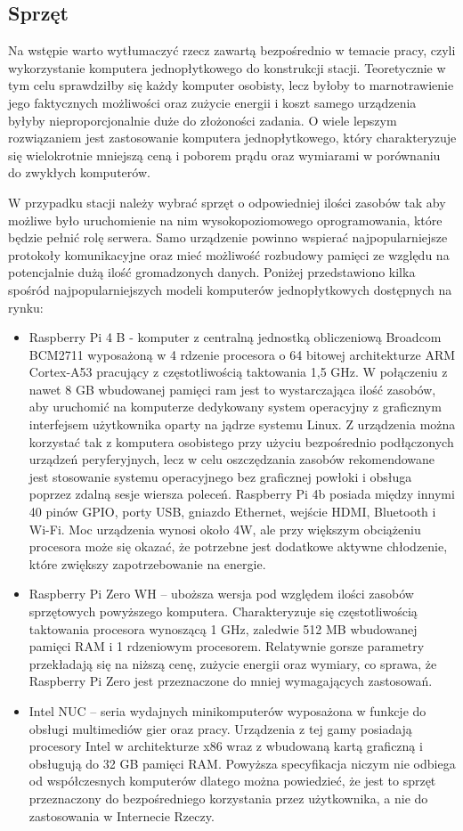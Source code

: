 \documentclass[12pt, twoside, openany]{mwrep}
\begin{document}
\subsection{Sprzęt}
Na wstępie warto wytłumaczyć rzecz zawartą bezpośrednio w temacie pracy, czyli wykorzystanie komputera jednopłytkowego do konstrukcji stacji. Teoretycznie w tym celu sprawdziłby się każdy komputer osobisty, lecz byłoby to marnotrawienie jego faktycznych możliwości oraz zużycie energii i koszt samego urządzenia byłyby nieproporcjonalnie duże do złożoności zadania. O wiele lepszym rozwiązaniem jest zastosowanie komputera jednopłytkowego, który charakteryzuje się wielokrotnie mniejszą ceną i poborem prądu oraz wymiarami w porównaniu do zwykłych komputerów.
\par
W przypadku stacji należy wybrać sprzęt o odpowiedniej ilości zasobów tak aby możliwe było uruchomienie na nim wysokopoziomowego oprogramowania, które będzie pełnić rolę serwera. Samo urządzenie powinno wspierać najpopularniejsze protokoły komunikacyjne oraz mieć możliwość rozbudowy pamięci ze względu na potencjalnie dużą ilość gromadzonych danych. Poniżej przedstawiono kilka spośród najpopularniejszych modeli komputerów jednopłytkowych dostępnych na rynku:
\begin{itemize}
\item	Raspberry Pi 4 B - komputer z centralną jednostką obliczeniową Broadcom BCM2711 wyposażoną w 4 rdzenie procesora o 64 bitowej architekturze ARM Cortex-A53 pracujący z częstotliwością taktowania 1,5 GHz. W połączeniu z nawet 8 GB wbudowanej pamięci ram jest to wystarczająca ilość zasobów, aby uruchomić na komputerze dedykowany system operacyjny z graficznym interfejsem użytkownika oparty na jądrze systemu Linux. Z urządzenia można korzystać tak z komputera osobistego przy użyciu bezpośrednio podłączonych urządzeń peryferyjnych, lecz w celu oszczędzania zasobów rekomendowane jest stosowanie systemu operacyjnego bez graficznej powłoki i obsługa poprzez zdalną sesje wiersza poleceń. Raspberry Pi 4b posiada między innymi 40 pinów GPIO, porty USB, gniazdo Ethernet, wejście HDMI, Bluetooth i Wi-Fi. Moc urządzenia wynosi około 4W, ale przy większym obciążeniu procesora może się okazać, że potrzebne jest dodatkowe aktywne chłodzenie, które zwiększy zapotrzebowanie na energie.  
\item	Raspberry Pi Zero WH – uboższa wersja pod względem ilości zasobów sprzętowych powyższego komputera. Charakteryzuje się częstotliwością taktowania procesora wynoszącą 1 GHz, zaledwie 512 MB wbudowanej pamięci RAM i 1 rdzeniowym procesorem. Relatywnie gorsze parametry przekładają się na niższą cenę, zużycie energii oraz wymiary, co sprawa, że Raspberry Pi Zero jest przeznaczone do mniej wymagających zastosowań.
\item	Intel NUC – seria wydajnych minikomputerów wyposażona w funkcje do obsługi multimediów gier oraz pracy. Urządzenia z tej gamy posiadają procesory Intel w architekturze x86 wraz z wbudowaną kartą graficzną i obsługują do 32 GB pamięci RAM. Powyższa specyfikacja niczym nie odbiega od współczesnych komputerów dlatego można powiedzieć, że jest to sprzęt przeznaczony do bezpośredniego korzystania przez użytkownika, a nie do zastosowania w Internecie Rzeczy.
\end{itemize}
\end{document}
